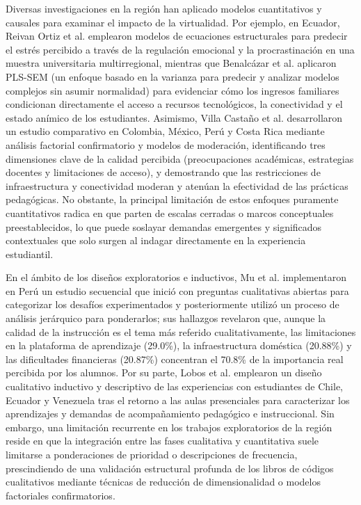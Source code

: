 \documentclass[conference]{IEEEtran}
\begin{document}
Diversas investigaciones en la región han aplicado modelos cuantitativos y causales para examinar el impacto de la virtualidad. Por ejemplo, en Ecuador, Reivan Ortiz et al. \cite{ReivanOrtiz2023PerceivedStress} emplearon modelos de ecuaciones estructurales para predecir el estrés percibido a través de la regulación emocional y la procrastinación en una muestra universitaria multirregional, mientras que Benalcázar et al. \cite{Benalcazar2022EducationalImpact} aplicaron PLS-SEM (un enfoque basado en la varianza para predecir y analizar modelos complejos sin asumir normalidad) para evidenciar cómo los ingresos familiares condicionan directamente el acceso a recursos tecnológicos, la conectividad y el estado anímico de los estudiantes. Asimismo, Villa Castaño et al. \cite{VillaCastano2022RemoteLessons} desarrollaron un estudio comparativo en Colombia, México, Perú y Costa Rica mediante análisis factorial confirmatorio y modelos de moderación, identificando tres dimensiones clave de la calidad percibida (preocupaciones académicas, estrategias docentes y limitaciones de acceso), y demostrando que las restricciones de infraestructura y conectividad moderan y atenúan la efectividad de las prácticas pedagógicas. No obstante, la principal limitación de estos enfoques puramente cuantitativos radica en que parten de escalas cerradas o marcos conceptuales preestablecidos, lo que puede soslayar demandas emergentes y significados contextuales que solo surgen al indagar directamente en la experiencia estudiantil.

En el ámbito de los diseños exploratorios e inductivos, Mu et al. \cite{Mu2022VirtualEducationChallenges} implementaron en Perú un estudio secuencial que inició con preguntas cualitativas abiertas para categorizar los desafíos experimentados y posteriormente utilizó un proceso de análisis jerárquico para ponderarlos; sus hallazgos revelaron que, aunque la calidad de la instrucción es el tema más referido cualitativamente, las limitaciones en la plataforma de aprendizaje (29.0\%), la infraestructura doméstica (20.88\%) y las dificultades financieras (20.87\%) concentran el 70.8\% de la importancia real percibida por los alumnos. Por su parte, Lobos et al. \cite{Lobos2023LessonsLearned} emplearon un diseño cualitativo inductivo y descriptivo de las experiencias con estudiantes de Chile, Ecuador y Venezuela tras el retorno a las aulas presenciales para caracterizar los aprendizajes y demandas de acompañamiento pedagógico e instruccional. Sin embargo, una limitación recurrente en los trabajos exploratorios de la región reside en que la integración entre las fases cualitativa y cuantitativa suele limitarse a ponderaciones de prioridad o descripciones de frecuencia, prescindiendo de una validación estructural profunda de los libros de códigos cualitativos mediante técnicas de reducción de dimensionalidad o modelos factoriales confirmatorios.
\end{document}
